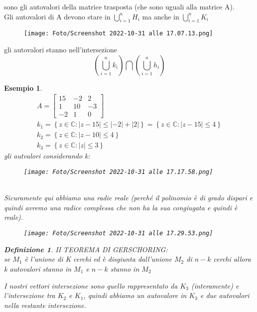 \documentclass[a4paper, portrait]{book}
\numberwithin{equation}{chapter} %
\newtheorem{definition}{Definizione}
\newtheorem{example}{Esempio}
\begin{document}
sono gli autovalori della matrice trasposta (che sono uguali alla matrice A).\\
Gli autovalori di A devono stare in $\bigcup_{i=1}^n H_i$ ma anche in $\bigcup_{i=1}^n K_i$
\begin{figure}[h!]
    \centering
    \texttt{[image: Foto/Screenshot 2022-10-31 alle 17.07.13.png]}
    \caption{}
\end{figure}
\newpage
gli autovalori stanno nell'intersezione
\begin{equation}
    \left(\bigcup_{i=1}^n k_i\right) \bigcap \left(\bigcup_{i=1}^n h_i\right)
\end{equation}
\begin{example}
    \begin{gather}
        A = \begin{bmatrix}
            15&-2&2\\
            1&10&-3\\
            -2&1&0
        \end{bmatrix}\\
        k_1 = \left\{ z \in \mathbb{C}: |z-15|\leq |-2|+|2|\right\} = \left\{z\in \mathbb{C}: |z-15|\leq 4\right\}\\
        k_2 = \left\{ z\in \mathbb{C}: |z-10|\leq 4\right\}\\
        k_3 = \left\{ z\in \mathbb{C}: |z|\leq 3\right\}
    \end{gather}
    gli autvalori considerando k:
    \begin{figure}[h!]
        \centering
        \texttt{[image: Foto/Screenshot 2022-10-31 alle 17.17.58.png]}
        \caption{}
    \end{figure}
    \\Sicuramente qui abbiamo una radie reale (perché il polinomio è di grado dispari e quindi avremo una radice complessa che non ha la sua congiugata e quindi è reale).
    \begin{figure}[h!]
        \centering
        \texttt{[image: Foto/Screenshot 2022-10-31 alle 17.29.53.png]}
        \caption{}
    \end{figure}
    \newpage
    \begin{definition}
        II TEOREMA DI GERSCHORING:\\
        se $M_1$ è l'unione di K cerchi ed è disgiunta dall'unione $M_2$ di $n-k$ cerchi allora k autovalori stanno in $M_1$ e $n-k$ stanno in $M_2$
    \end{definition}
    I nostri vettori intersezione sono quello rappresentato da $K_3$ (interamente) e l'intersezione tra $K_2$ e $K_1$, quindi abbiamo un autovalore in $K_3$ e due autovalori nella restante intersezione.\\
\end{example}
\end{document}
